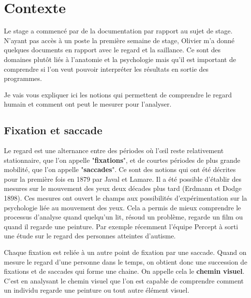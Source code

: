 \chapter{Contexte}
\par
Le stage a commencé par de la documentation par rapport au sujet de stage. N'ayant pas accès à un poste la première semaine de stage, Olivier m'a donné quelques documents en rapport avec le regard et la saillance. Ce sont des domaines plutôt liés à l'anatomie et la psychologie mais qu'il est important de comprendre si l'on veut pouvoir interpréter les résultats en sortie des programmes.
\par
Je vais vous expliquer ici les notions qui permettent de comprendre le regard humain et comment ont peut le mesurer pour l'analyser.

\section{Fixation et saccade}
\par
Le regard est une alternance entre des périodes où l'\oe{}il reste relativement stationnaire, que l'on appelle "\textbf{fixations}", et de courtes périodes de plus grande mobilité, que l'on appelle "\textbf{saccades}"\cite{gaze}. Ce sont des notions qui ont été décrites pour la première fois en 1879 par Javal et Lamare. Il a été possible d'établir des mesures sur le mouvement des yeux deux décades plus tard (Erdmann et Dodge 1898). Ces mesures ont ouvert le champs aux possibilités d'expérimentation sur la psychologie liée au mouvement des yeux. Cela a permis de mieux comprendre le processus d'analyse quand quelqu'un lit, résoud un problème, regarde un film ou quand il regarde une peinture. Par exemple récemment l'équipe Percept à sorti une étude sur le regard des personnes atteintes d'autisme.

\par
Chaque fixation est reliée à un autre point de fixation par une saccade. Quand on mesure le regard d'une personne dans le temps, on obtient donc une succession de fixations et de saccades qui forme une chaine. On appelle cela le \textbf{chemin visuel}. C'est en analysant le chemin visuel que l'on est capable de comprendre comment un individu regarde une peinture ou tout autre élément visuel.

